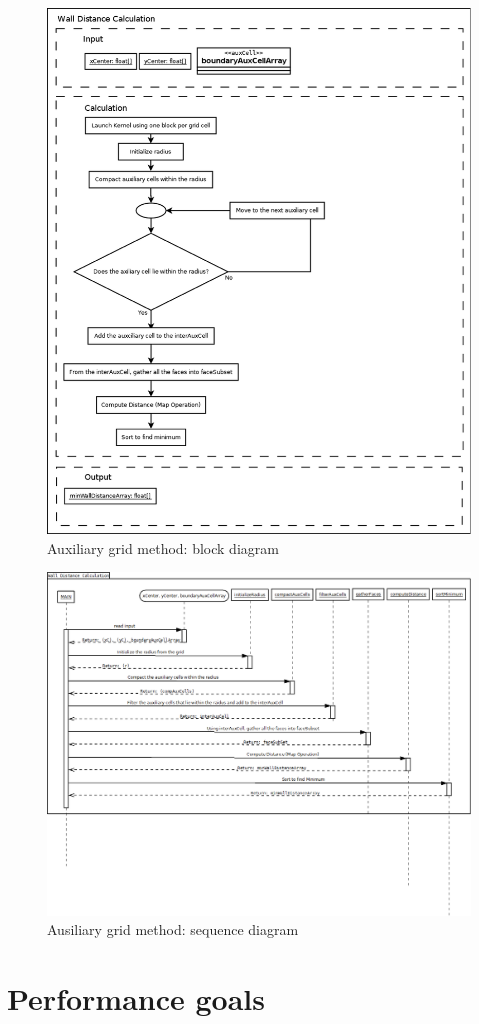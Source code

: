 \documentclass[]{aiaa-tc}%
\begin{document}
\begin{figure}
  \centering
  \includegraphics[width=0.7\linewidth]{figures/auxiliary_grid/ab_block}
  \caption{Auxiliary grid method: block diagram}
  \label{f:ag_block}
\end{figure}


\begin{figure}
  \centering
  \includegraphics[trim=0.0cm 11.0cm 0.0cm 0.0cm, clip=true, width=0.7\linewidth]{figures/auxiliary_grid/wallDistance_sequence}
  \caption{Ausiliary grid method: sequence diagram}
  \label{f:ag_sequence}
\end{figure}

\section{Performance goals}
\end{document}
